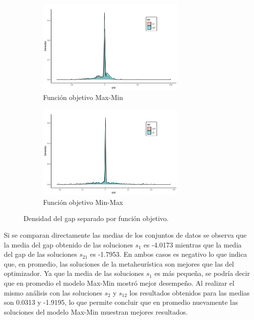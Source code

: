 \documentclass[preprint,12pt,authoryear]{elsarticle}
\begin{document}
\begin{figure}
	\begin{subfigure}{\textwidth}
		\centering
		\includegraphics[width=0.8\textwidth]{histden_sols_ob1.png}
		\caption{Función objetivo Max-Min}
	\end{subfigure}
	\begin{subfigure}{\textwidth}
		\centering
		\includegraphics[width=0.8\textwidth]{histden_sols_ob2.png}
		\caption{Función objetivo Min-Max}
	\end{subfigure}
	\caption{Densidad del gap separado por función objetivo.}
	\label{densidad}
\end{figure}

Si se comparan directamente las medias de los conjuntos de datos se observa que la media del gap obtenido de las soluciones $s_1$ es -4.0173 mientras que la media del gap de las soluciones $s_{21}$ es -1.7953. En ambos casos es negativo lo que indica que, en promedio, las soluciones de la metaheurística son mejores que las del optimizador. Ya que la media de las soluciones $s_1$ es más pequeña, se podría decir que en promedio el modelo Max-Min mostró mejor desempeño. Al realizar el mismo análisis con las soluciones $s_2$ y $s_12$ los resultados obtenidos para las medias son 0.0313 y -1.9195, lo que permite concluir que en promedio nuevamente las soluciones del modelo Max-Min muestran mejores resultados. 
\end{document}
